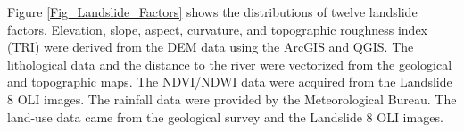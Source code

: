 \documentclass[a4paper,fleqn]{cas-sc}
\begin{document}
Figure \ref{Fig_Landslide_Factors} shows the distributions of twelve landslide factors. 
Elevation, slope, aspect, curvature, and topographic roughness index (TRI) were derived from the DEM data using the ArcGIS and QGIS. 
The lithological data and the distance to the river were vectorized from the geological and topographic maps. 
The NDVI/NDWI data were acquired from the Landslide 8 OLI images. 
The rainfall data were provided by the Meteorological Bureau. 
The land-use data came from the geological survey and the Landslide 8 OLI images.

\begin{figure}
  \centering
    \quad
    \quad
\end{figure}
\end{document}
